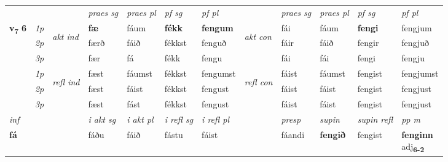 \begin{longtable}[l]{X>{\footnotesize\itshape}llXXXXlXXXX}
\midrule
 & &   & \textit{praes sg}  & \textit{praes pl}    & \textit{ pf sg} & \textit{pf pl} & & \textit{praes sg}  & \textit{praes pl}    & \textit{pf sg} & \textit{pf pl }  \\ \cmidrule{4-7} \cmidrule{9-12}
 \multirow{2}{*}{{{\textbf{v{\textsubscript{7}}} \Large{\textbf{6}}}}}  & 1p & \multirow{3}{*}{\begin{turn}{90}\textit{akt ind}\end{turn}} & \textbf{fæ} & fáum & \textbf{fékk} & \textbf{fengum} & \multirow{3}{*}{\begin{turn}{90}\textit{akt con}\end{turn}} &fái & fáum & \textbf{fengi} & fengjum\\*
 & 2p &  &  færð  & fáið & fékkst & fenguð & & fáir & fáið & fengir & fengjuð \\*
 & 3p &  & fær & fá & fékk & fengu & & fái & fái& fengi & fengju \\*
\cmidrule{4-7} \cmidrule{9-12}
 & 1p & \multirow{3}{*}{\begin{turn}{90}\textit{refl ind}\end{turn}}  & fæst & fáumst & fékkst & fengumst & \multirow{3}{*}{\begin{turn}{90}\textit{refl con}\end{turn}}  &fáist & fáumst & fengist & fengjumst \\*
 & 2p &  & fæst & fáist & fékkst & fengust & &fáist & fáist & fengist & fengjust \\*
 & 3p  & & fæst & fást & fékkst & fengust & & fáist & fáist& fengist & fengjust \\*
\cmidrule{4-7} \cmidrule{9-12}

   {\textit{inf}} & &  & \textit{i akt sg} & \textit{i akt pl} & \textit{i refl sg} & \textit{i refl pl} && \textit{presp} & \textit{supin} & \textit{supin refl} & \textit{pp m} \\*
  {\textbf{fá}} & && fáðu  & fáið & fástu & fáist && fáandi &  \textbf{fengið} & fengist & \specialcell{\textbf{fenginn} \\ adj\textbf{\textsubscript{6-2}}} \\*

\midrule


\end{longtable}
